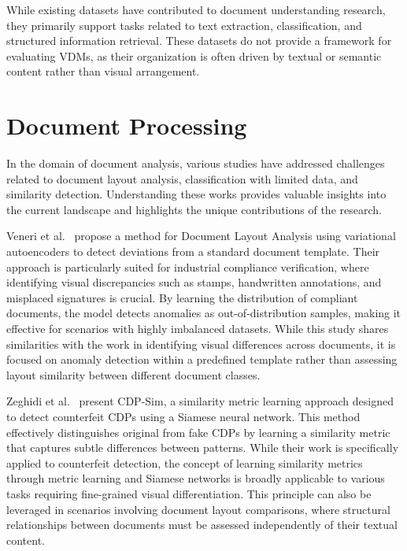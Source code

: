 While existing datasets have contributed to document understanding research, they primarily support tasks related to text extraction, classification, and structured information retrieval. These datasets do not provide a framework for evaluating \glspl{VDM}, as their organization is often driven by textual or semantic content rather than visual arrangement.

\section{Document Processing}

In the domain of document analysis, various studies have addressed challenges related to document layout analysis, classification with limited data, and similarity detection. Understanding these works provides valuable insights into the current landscape and highlights the unique contributions of the research.

Veneri et al.~\cite{youssef_document_2022} propose a method for Document Layout Analysis using variational autoencoders to detect deviations from a standard document template. Their approach is particularly suited for industrial compliance verification, where identifying visual discrepancies such as stamps, handwritten annotations, and misplaced signatures is crucial. By learning the distribution of compliant documents, the model detects anomalies as out-of-distribution samples, making it effective for scenarios with highly imbalanced datasets. While this study shares similarities with the work in identifying visual differences across documents, it is focused on anomaly detection within a predefined template rather than assessing layout similarity between different document classes.%

Zeghidi et al.~\cite{zeghidi_cdp-sim_2023} present CDP-Sim, a similarity metric learning approach designed to detect counterfeit \glspl{CDP} using a Siamese neural network. This method effectively distinguishes original from fake \glspl{CDP} by learning a similarity metric that captures subtle differences between patterns. While their work is specifically applied to counterfeit detection, the concept of learning similarity metrics through metric learning and Siamese networks is broadly applicable to various tasks requiring fine-grained visual differentiation. This principle can also be leveraged in scenarios involving document layout comparisons, where structural relationships between documents must be assessed independently of their textual content.

